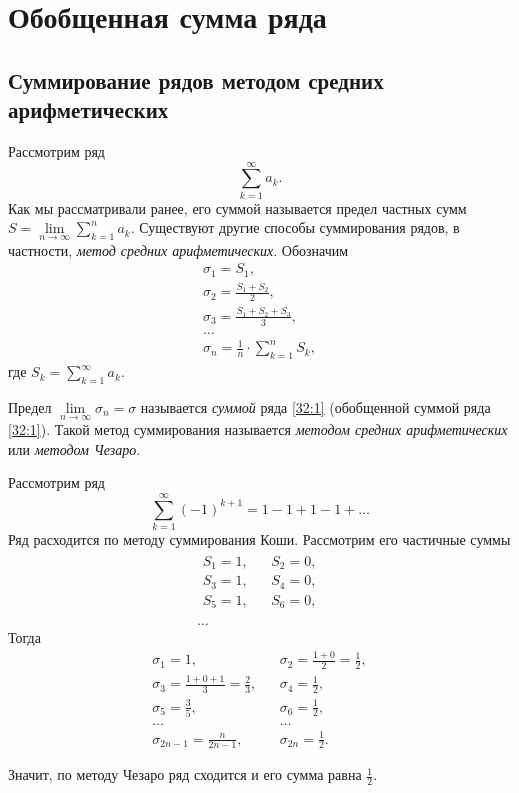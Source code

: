 \documentclass[../../main.tex]{subfiles}
\begin{document}
\section{Обобщенная сумма ряда}

\subsection{Суммирование рядов методом средних арифметических}

Рассмотрим ряд
\begin{equation}
 \sum\limits_{k=1}^\infty a_k.
 \label{32:1}
\end{equation}
Как мы рассматривали ранее, его суммой называется предел частных сумм $S = 
\lim\limits_{n\to\infty} \sum\limits_{k=1}^n a_k$. Существуют другие способы 
суммирования рядов, в частности, \emph{метод средних арифметических}. 
Обозначим 
\begin{gather*}
 \sigma_1 = S_1, \\
 \sigma_2 = \frac{S_1 + S_2}2, \\
 \sigma_3 = \frac{S_1 + S_2 + S_3}3, \\
 \dots\\
 \sigma_n = \frac1n\cdot\sum\limits_{k=1}^n S_k,
\end{gather*}
где $S_k = \sum\limits_{k=1}^\infty a_k$.

Предел $\lim\limits_{n\to\infty} \sigma_n = \sigma$ называется \emph{суммой} 
ряда \eqref{32:1} (обобщенной суммой ряда \eqref{32:1}). Такой метод 
суммирования называется \emph{методом средних арифметических} или 
\emph{методом Чезаро}.

\begin{exmp}
 Рассмотрим ряд
 \[\sum\limits_{k=1}^\infty (-1)^{k+1} = 1-1+1-1+\dots\]
 Ряд расходится по методу суммирования Коши. Рассмотрим его частичные суммы
 \begin{gather*}
  \begin{array}{lll}
   S_1 = 1,&& S_2 = 0, \\
   S_3 = 1,&& S_4 = 0, \\
   S_5 = 1,&& S_6 = 0, \\
  \end{array} \\
  \dots
 \end{gather*}
Тогда
\[
 \begin{array}{lll}
 \sigma_1 = 1,&&
 \sigma_2 = \frac{1+0}2 = \frac12, \\
 \sigma_3 = \frac{1+0+1}3 = \frac23,&&
 \sigma_4 = \frac12, \\
 \sigma_5 = \frac35,&&
 \sigma_6 = \frac12, \\
 \dots&& \dots \\
 \sigma_{2n-1} = \frac{n}{2n-1},&& \sigma_{2n}=\frac12.
 \end{array}
\]

Значит, по методу Чезаро ряд сходится и его сумма равна $\frac12$.
\end{exmp}
\end{document}
